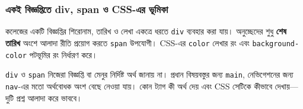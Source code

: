 \subsubsection{একই বিজ্ঞপ্তিতে div, span ও CSS-এর ভূমিকা}
কলেজের একটি বিজ্ঞপ্তির শিরোনাম, তারিখ ও লেখা একত্রে ধরতে \texttt{div} ব্যবহার করা যায়। অনুচ্ছেদের শুধু \textbf{শেষ তারিখ} অংশে আলাদা রীতি প্রয়োগ করতে \texttt{span} উপযোগী। CSS-এর \texttt{color} লেখার রং এবং \texttt{background-color} পটভূমির রং নির্ধারণ করে।

\texttt{div} ও \texttt{span} নিজেরা বিজ্ঞপ্তি বা মেনুর নির্দিষ্ট অর্থ জানায় না। প্রধান বিষয়বস্তুর জন্য \texttt{main}, নেভিগেশনের জন্য \texttt{nav}-এর মতো অর্থবোধক অংশ বেছে নেওয়া যায়। কোন ট্যাগ কী অর্থ দেয় এবং CSS সেটিকে কীভাবে দেখায়—দুটি প্রশ্ন আলাদা করে ভাববে।

